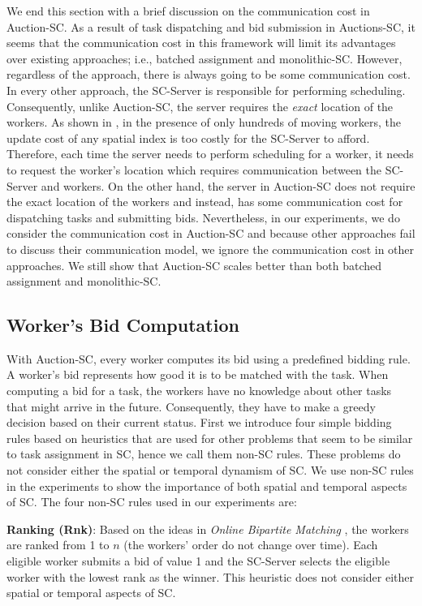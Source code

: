 We end this section with a brief discussion on the communication cost in Auction-SC. As a result of task dispatching and bid submission in Auctions-SC, it seems that the communication cost in this framework will limit its advantages over existing approaches; i.e., batched assignment and monolithic-SC. However, regardless of the approach, there is always going to be some communication cost. In every other approach, the SC-Server is responsible for performing scheduling. Consequently, unlike Auction-SC, the server requires the \textit{exact} location of the workers. As shown in \cite{Akdogan14}, in the presence of only hundreds of moving workers, the update cost of any spatial index is too costly for the SC-Server to afford. Therefore, each time the server needs to perform scheduling for a worker, it needs to request the worker's location which requires communication between the SC-Server and workers. On the other hand, the server in Auction-SC does not require the exact location of the workers and instead, has some communication cost for dispatching tasks and submitting bids. Nevertheless, in our experiments, we do consider the communication cost in Auction-SC and because other approaches fail to discuss their communication model, we ignore the communication cost in other approaches. We still show that Auction-SC scales better than both batched assignment and monolithic-SC.\\

\subsection{Worker's Bid Computation}
\label{subsec:bidding}

With Auction-SC, every worker computes its bid using a predefined bidding rule. A worker's bid represents how good it is to be matched with the task. When computing a bid for a task, the workers have no knowledge about other tasks that might arrive in the future. Consequently, they have to make a greedy decision based on their current status. First we introduce four simple bidding rules based on heuristics that are used for other problems that seem to be similar to task assignment in SC, hence we call them non-SC rules. These problems do not consider either the spatial or temporal dynamism of SC. We use non-SC rules in the experiments to show the importance of both spatial and temporal aspects of SC. The four non-SC rules used in our experiments are:

\noindent\textbf{Ranking (Rnk)}:
Based on the ideas in \emph{Online Bipartite Matching} \cite{Karp90}, the workers are ranked from 1 to $n$ (the workers' order do not change over time). Each eligible worker submits a bid of value 1 and the SC-Server selects the eligible worker with the lowest rank as the winner. This heuristic does not consider either spatial or temporal aspects of SC.


